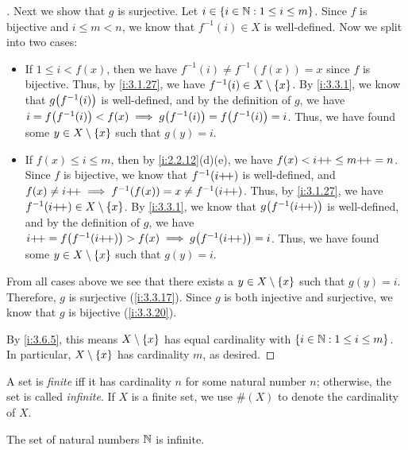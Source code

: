 \begin{proof}[]
  Next we show that \(g\) is surjective.
  Let \(i \in \left\lbrace i \in \mathbb{N} : 1 \leq i \leq m\right\rbrace\).
  Since \(f\) is bijective and \(i \leq m < n\), we know that \(f^{-1}(i) \in X\) is well-defined.
  Now we split into two cases:
  \begin{itemize}
    \item If \(1 \leq i < f(x)\), then we have \(f^{-1}(i) \neq f^{-1}(f(x)) = x\) since \(f\) is bijective.
          Thus, by \cref{i:3.1.27}, we have \(f^{-1}(i) \in X \setminus \left\lbrace x\right\rbrace\).
          By \cref{i:3.3.1}, we know that \(g\pa{f^{-1}(i)}\) is well-defined, and by the definition of \(g\), we have \(i = f\pa{f^{-1}(i)} < f(x) \implies g\pa{f^{-1}(i)} = f\pa{f^{-1}(i)} = i\).
          Thus, we have found some \(y \in X \setminus \left\lbrace x\right\rbrace\) such that \(g(y) = i\).
    \item If \(f(x) \leq i \leq m\), then by \cref{i:2.2.12}(d)(e), we have \(f(x) < i{+}\!{+} \leq m{+}\!{+} = n\).
          Since \(f\) is bijective, we know that \(f^{-1}(i{+}\!{+})\) is well-defined, and \(f(x) \neq i{+}\!{+} \implies f^{-1}(f(x)) = x \neq f^{-1}(i{+}\!{+})\).
          Thus, by \cref{i:3.1.27}, we have \(f^{-1}(i{+}\!{+}) \in X \setminus \left\lbrace x\right\rbrace\).
          By \cref{i:3.3.1}, we know that \(g\pa{f^{-1}(i\pp)}\) is well-defined, and by the definition of \(g\), we have \(i\pp = f\pa{f^{-1}(i\pp)} > f(x) \implies g\pa{f^{-1}(i\pp)} = i\).
          Thus, we have found some \(y \in X \setminus \left\lbrace x\right\rbrace\) such that \(g(y) = i\).
  \end{itemize}
  From all cases above we see that there exists a \(y \in X \setminus \left\lbrace x\right\rbrace\) such that \(g(y) = i\).
  Therefore, \(g\) is surjective (\cref{i:3.3.17}).
  Since \(g\) is both injective and surjective, we know that \(g\) is bijective (\cref{i:3.3.20}).

  By \cref{i:3.6.5}, this means \(X \setminus \left\lbrace x\right\rbrace\) has equal cardinality with \(\left\lbrace i \in \mathbb{N} : 1 \leq i \leq m\right\rbrace\).
  In particular, \(X \setminus \left\lbrace x\right\rbrace\) has cardinality \(m\), as desired.
\end{proof}

\begin{defn}\label{i:3.6.10}
  A set is \emph{finite} iff it has cardinality \(n\) for some natural number \(n\);
  otherwise, the set is called \emph{infinite}.
  If \(X\) is a finite set, we use \(\#(X)\) to denote the cardinality of \(X\).
\end{defn}

\setcounter{thm}{11}
\begin{thm}\label{i:3.6.12}
  The set of natural numbers \(\mathbb{N}\) is infinite.
\end{thm}

